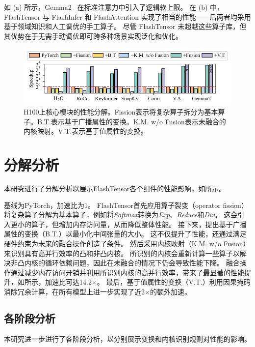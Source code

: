 如 (a) 所示，Gemma2~\cite{team2024gemma2} 在标准注意力中引入了逻辑软上限。
在 (b) 中，FlashTensor 与 FlashInfer 和 FlashAttention 实现了相当的性能——后两者均采用基于领域知识和人工调优的手工算子。
尽管 FlashTensor 未超越这些算子库，但其优势在于无需手动调优即可跨多种场景实现泛化和优化。

\begin{figure}[ht]
    \centering
    \includegraphics[width=\linewidth]{figures/flashtensor/breakdown.pdf}
    \caption{H100上核心模块的性能分解。Fission表示将复杂算子拆分为基本算子。B.T.表示基于广播属性的变换。K.M. w/o Fusion表示未融合的内核映射。V.T.表示基于值属性的变换。}
    \label{fig:breakdown}
\end{figure}


\section{分解分析}
本研究进行了分解分析以展示FlashTensor各个组件的性能影响，如所示。

基线为PyTorch，加速比为1。
FlashTensor首先应用算子裂变（operator fission）将复杂算子分解为基本算子，例如将\textit{Softmax}转换为\textit{Exp}、\textit{Reduce}和\textit{Div}。
这会引入更小的算子，但增加内存访问量，从而降低整体性能。
接下来，提出基于广播属性的变换（B.T.）以最小化中间张量的大小。
这不仅提升了性能，还通过满足硬件约束为未来的融合操作创造了条件。
然后采用内核映射（K.M. w/o Fusion）来识别具有高并行效率的凸和非凸内核。
所识别的内核会重新计算一些算子以解决非凸内核的循环依赖问题，因此在未融合的情况下仍会导致性能下降。
融合操作通过减少内存访问开销并利用所识别内核的高并行效率，带来了最显著的性能提升，如所示，加速比可达14.2$\times$。
最后，基于值属性的变换（V.T.）利用因果掩码消除冗余计算，在所有模型上进一步实现了近2$\times$的额外加速。


\subsection{各阶段分析}
本研究进一步进行了各阶段分析，以分别展示变换和内核识别规则对性能的影响。

